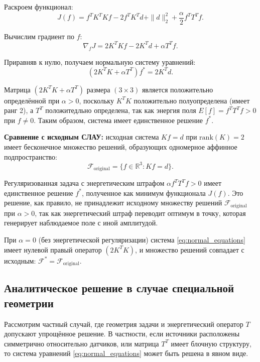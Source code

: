 \documentclass[sn-mathphys-num]{bst/sn-jnl}
\theoremstyle{thmstylethree}
\theoremstyle{thmstyletwo}
\theoremstyle{thmstyleone}
\begin{document}
Раскроем функционал:
\begin{equation}
    J(f) = f^TK^TKf - 2f^TK^Td + \|d\|_2^2 + \frac{\alpha}{2}f^T T^T f.
\end{equation}

Вычислим градиент по $f$:
\begin{equation}
    \nabla_f J = 2K^TKf - 2K^Td + \alpha T^T f.
\end{equation}

Приравняв к нулю, получаем нормальную систему уравнений:
\begin{equation}\label{eq:normal_equations}
    (2K^TK + \alpha T^T)f^* = 2K^Td.
\end{equation}

Матрица $(2K^TK + \alpha T^T)$ размера $(3 \times 3)$ является положительно определённой при $\alpha > 0$, 
поскольку $K^TK$ положительно полуопределена (имеет ранг 2), а $T^T$ положитедльно определена, так как энергия 
поля $E[f] = f^T T^T f > 0$ при $f \neq 0$.
Таким образом, система имеет единственное решение $f^*$.

\textbf{Сравнение с исходным СЛАУ:} исходная система $Kf = d$ при $\mathrm{rank}(K) = 2$ имеет бесконечное 
множество решений, образующих одномерное аффинное подпространство:
\begin{equation}\label{eq:original_solution_set}
    \mathcal{F}_{\mathrm{original}} = \{f \in \mathbb{R}^3 : Kf = d\}.
\end{equation}

Регуляризованная задача с энергетическим штрафом $\alpha f^T T^T f > 0$ имеет единственное решение $f^*$, полученное как минимум функционала $J(f)$. 
Это решение, как правило, не принадлежит исходному множеству решений $\mathcal{F}_{\mathrm{original}}$ при $\alpha > 0$, так как энергетический штраф 
переводит оптимум в точку, которая генерирует наблюдаемое поле с иной амплитудой.

При $\alpha = 0$ (без энергетической регуляризации) система \eqref{eq:normal_equations} имеет нулевой правый оператор $(2K^TK)$, и множество решений 
совпадает с исходным: $\mathcal{F}^* = \mathcal{F}_{\mathrm{original}}$.

\subsection{Аналитическое решение в случае специальной геометрии}

Рассмотрим частный случай, где геометрия задачи и энергетический оператор $T$ допускают упрощённое решение. 
В частности, если источники расположены симметрично относительно датчиков, или матрица $T^T$ имеет блочную структуру, то система уравнений \eqref{eq:normal_equations} может быть решена в явном виде.
\end{document}
